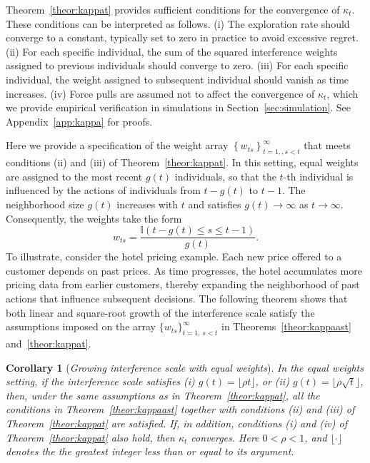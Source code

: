 \documentclass[12pt]{article}
\newtheorem{corollary}[theorem]{Corollary}
\begin{document}
Theorem~\ref{theor:kappat} provides sufficient conditions for the convergence of $\kappa_t$. These conditions can be interpreted as follows.  
(i) The exploration rate should converge to a constant, typically set to zero in practice to avoid excessive regret.  
(ii) For each specific individual, the sum of the squared interference weights assigned to previous individuals should converge to zero.  
(iii) For each specific individual, the weight assigned to subsequent individual should vanish as time increases.  
(iv) Force pulls are assumed not to affect the convergence of $\kappa_t$, which we provide empirical verification in simulations in Section~\ref{sec:simulation}.
See Appendix~\ref{app:kappa} for proofs.


Here we provide a specification of the weight array $\left\{w_{ts}\right\}_{t=1,,s<t}^\infty$ that meets conditions (ii) and (iii) of Theorem~\ref{theor:kappat}. In this setting, equal weights are assigned to the most recent $g(t)$ individuals, so that the $t$-th individual is influenced by the actions of individuals from $t-g(t)$ to $t-1$. The neighborhood size $g(t)$ increases with $t$ and satisfies $g(t)\to \infty$ as $t \to \infty$. Consequently, the weights take the form  
\[
w_{ts} = \frac{\mathbb{I}(t-g(t) \le s \le t-1)}{g(t)}.
\]
To illustrate, consider the hotel pricing example. Each new price offered to a customer depends on past prices. As time progresses, the hotel accumulates more pricing data from earlier customers, thereby expanding the neighborhood of past actions that influence subsequent decisions. The following theorem shows that both linear and square-root growth of the interference scale satisfy the assumptions imposed on the array $\{w_{ts}\}_{t=1,\,s<t}^\infty$ in Theorems~\ref{theor:kappaast} and~\ref{theor:kappat}. %

\begin{corollary}[{\emph{Growing interference scale with equal weights}}]
\label{theor:gt}
In the equal weights setting, if the interference scale satisfies
(i) $g(t) = \lfloor \rho t \rfloor$, or  
(ii) $g(t) = \lfloor \rho \sqrt{t} \rfloor$,  
then, under the same assumptions as in Theorem~\ref{theor:kappat}, all the conditions in Theorem~\ref{theor:kappaast} together with conditions (ii) and (iii) of Theorem~\ref{theor:kappat} are satisfied. If, in addition, conditions (i) and (iv) of Theorem~\ref{theor:kappat} also hold, then $\kappa_t$ converges.  
Here $0 < \rho < 1$, and $\lfloor \cdot \rfloor$ denotes the the greatest integer less than or equal to its argument.
\end{corollary}
\end{document}
